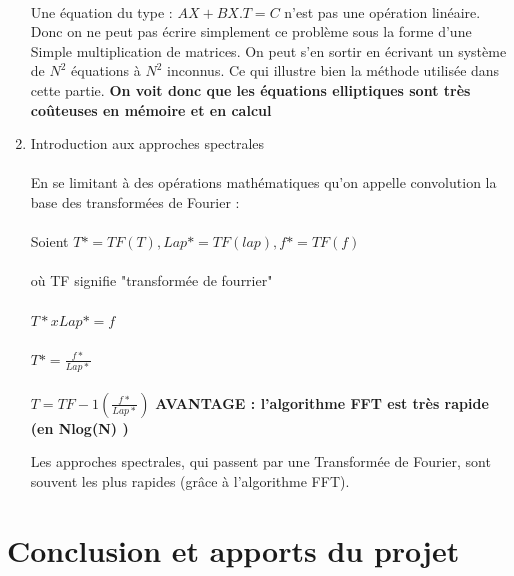 \documentclass{article}
\begin{document}
\begin{enumerate}
   \paragraph{}
   Une équation du type : $A X + B X.T = C $ n’est pas une opération linéaire.
   Donc on ne peut pas écrire simplement ce problème sous la forme d’une Simple multiplication de matrices. 
   On peut s’en sortir en écrivant un système de $N^2$ équations à $N^2$ inconnus. 
   Ce qui illustre bien la méthode utilisée dans cette partie. 
   \textbf{On voit donc que les équations elliptiques sont très coûteuses en mémoire et
   en calcul} 
  \item { Introduction aux approches spectrales } 
  \paragraph{}
  En se limitant à des opérations mathématiques qu'on appelle convolution la base des transformées de Fourier  : 
  \paragraph{}
  Soient $T*= TF(T), Lap*=TF(lap) , f*=TF (f)$ 
  \paragraph{}
  où TF signifie "transformée de fourrier"
  \paragraph{}
  $T*xLap*= f$
  \paragraph{}
  $T*= \frac{f*}{Lap*}$ 
  \paragraph{}
  $T = TF-1 (\frac{f*}{Lap*})$  
  \textbf{ AVANTAGE : l’algorithme FFT est très rapide (en Nlog(N) )} 
  
  Les approches spectrales, qui passent par une Transformée de Fourier, sont souvent les plus
  rapides (grâce à l’algorithme FFT). 
   
   \end{enumerate} 

   
  
   
    

\section*{Conclusion et apports du projet}
\end{document}

